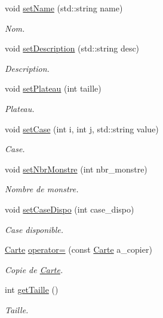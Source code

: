 \begin{DoxyCompactItemize}
void \hyperlink{class_carte_a1d79dbe6ded5abd1e3f1a3192af0720e}{set\+Name} (std\+::string name)
\begin{DoxyCompactList}\small\item\em Nom. \end{DoxyCompactList}\item 
void \hyperlink{class_carte_afda8b2f0e96175d97c42afe87f535e15}{set\+Description} (std\+::string desc)
\begin{DoxyCompactList}\small\item\em Description. \end{DoxyCompactList}\item 
void \hyperlink{class_carte_ae9928759af0c0a63eb93039ec0d053b4}{set\+Plateau} (int taille)
\begin{DoxyCompactList}\small\item\em Plateau. \end{DoxyCompactList}\item 
void \hyperlink{class_carte_ac7dc1d4cb0accd36b36cb6c6c89103fd}{set\+Case} (int i, int j, std\+::string value)
\begin{DoxyCompactList}\small\item\em Case. \end{DoxyCompactList}\item 
void \hyperlink{class_carte_ae05165c486b5bc7645dc1e98b10ee395}{set\+Nbr\+Monstre} (int nbr\+\_\+monstre)
\begin{DoxyCompactList}\small\item\em Nombre de monstre. \end{DoxyCompactList}\item 
void \hyperlink{class_carte_a2204f308cb00bde0ede787fb2ea5fa85}{set\+Case\+Dispo} (int case\+\_\+dispo)
\begin{DoxyCompactList}\small\item\em Case disponible. \end{DoxyCompactList}\item 
\hyperlink{class_carte}{Carte} \hyperlink{class_carte_a4878501e2a178dd862471666b013f270}{operator=} (const \hyperlink{class_carte}{Carte} a\+\_\+copier)
\begin{DoxyCompactList}\small\item\em Copie de \hyperlink{class_carte}{Carte}. \end{DoxyCompactList}\item 
int \hyperlink{class_carte_a507502fe5beff8008e5608519086be12}{get\+Taille} ()
\begin{DoxyCompactList}\small\item\em Taille. \end{DoxyCompactList}\item 

\end{DoxyCompactItemize}

